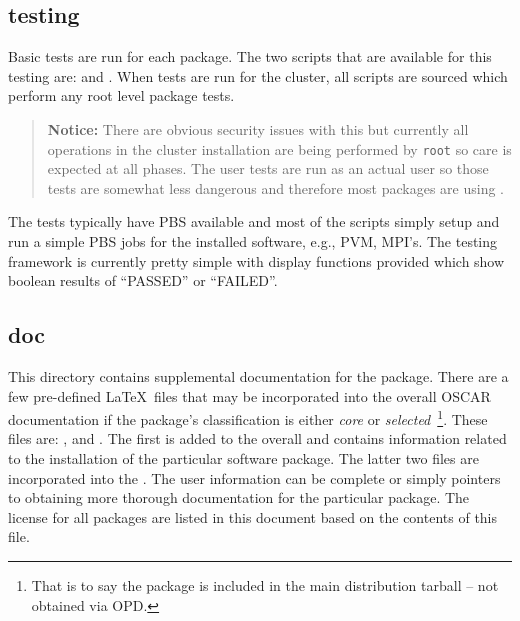 \subsection{testing}
\label{sect:pkg-testing}

Basic tests are run for each package.  The two scripts that are available
for this testing are:  and .  When tests
are run for the cluster, all  scripts are sourced which
perform any root level package tests.  

\begin{verse}
   {\bfseries Notice: } There are obvious security issues with this
   but currently all operations in the cluster installation are being
   performed by {\tt root} so care is expected at all phases.  The user
   tests are run as an actual user so those tests are somewhat less 
   dangerous and therefore most packages are using .
\end{verse}


The tests typically have PBS available and most of the 
scripts simply setup and run a simple PBS jobs for the installed software,
e.g., PVM, MPI's.  The testing framework is currently pretty simple with
display functions provided which show boolean results of ``PASSED'' or
``FAILED''.




 
\subsection{doc}
\label{sect:pkg-doc}

This directory contains supplemental documentation for the package.  There
are a few pre-defined \LaTeX\ files that may be incorporated into the
overall OSCAR documentation if the package's classification is either
\emph{core} or \emph{selected}~\footnote{That is to say the package is
included in the main distribution tarball -- not obtained via OPD.}.  These
files are: ,  and .  The
first is added to the overall  and contains information
related to the installation of the particular software package.  The latter
two files are incorporated into the .   The user information
can be complete or simply pointers to obtaining more thorough documentation
for the particular package.  The license for all packages are listed in
this document based on the contents of this  file.


